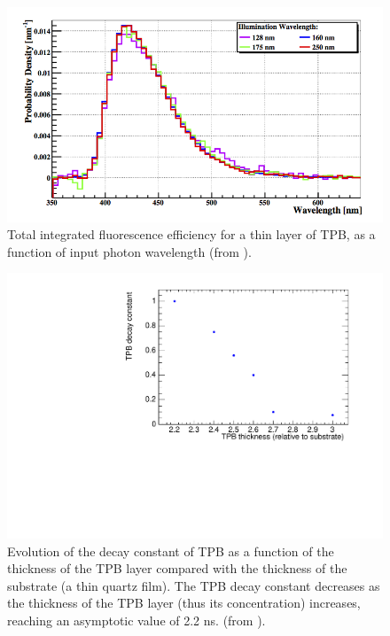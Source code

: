 \documentclass[review]{elsarticle}
\begin{document}
\begin{figure}[!htbp]
	\centering
	\includegraphics[scale=0.6]{../img/TPBSpectrum.png}
	\caption{Total integrated fluorescence efficiency for a thin layer of TPB, as a function of input  photon wavelength
	(from \cite{Gehman:2011xm}).  }\label{fig.tpbeff} 
\end{figure}

\begin{figure}[!htbp]
	\centering
	\includegraphics[scale=0.6]{../img/TPBdecays.pdf}
	\caption{Evolution of the decay constant of TPB as a function of the thickness of the TPB layer compared
	with the thickness of the substrate (a thin quartz film). The TPB decay constant decreases as the thickness of the TPB layer (thus its concentration) increases, reaching an asymptotic value of 2.2 ns.   
	(from \cite{TPBtau}).  }\label{fig.tpbtau} 
\end{figure}
\end{document}
